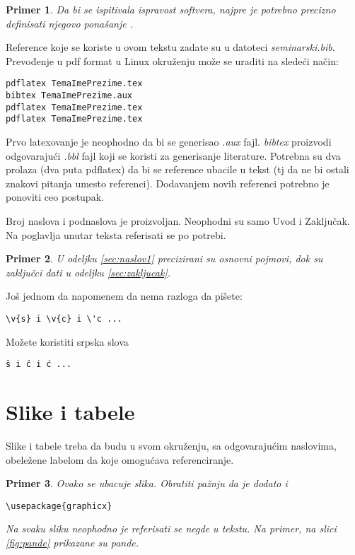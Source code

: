 \documentclass[a4paper]{article}
\newtheorem{primer}{Primer}[section]
\begin{document}
\begin{primer}
 Da bi se ispitivala ispravost softvera, najpre je potrebno precizno definisati njegovo ponašanje \cite{laski2009software}. 
\end{primer}

Reference koje se koriste u ovom tekstu zadate su u datoteci {\em seminarski.bib}. Prevođenje u pdf format u Linux okruženju može se uraditi na sledeći način:
\begin{verbatim}
pdflatex TemaImePrezime.tex 
bibtex TemaImePrezime.aux 
pdflatex TemaImePrezime.tex 
pdflatex TemaImePrezime.tex 
\end{verbatim}
Prvo latexovanje je neophodno da bi se generisao {\em .aux} fajl. {\em bibtex} proizvodi odgovarajući {\em .bbl} fajl koji se koristi za generisanje literature. 
Potrebna su dva prolaza (dva puta pdflatex) da bi se reference ubacile u tekst (tj da ne bi ostali znakovi pitanja umesto referenci). Dodavanjem novih referenci potrebno je ponoviti ceo postupak.  











Broj naslova i podnaslova je proizvoljan. Neophodni su samo Uvod i Zaključak. Na poglavlja unutar teksta referisati se po potrebi. 
\begin{primer}
U odeljku \ref{sec:naslov1} precizirani su osnovni pojmovi, dok su zaključci dati u odeljku \ref{sec:zakljucak}.
\end{primer}

Još jednom da napomenem da nema razloga da pišete:
\begin{verbatim}
\v{s} i \v{c} i \'c ...
\end{verbatim}
Možete koristiti srpska slova
\begin{verbatim}
š i č i ć ... 
\end{verbatim}



\section{Slike i tabele}
\label{slike_i_tabele}

Slike i tabele treba da budu u svom okruženju, sa odgovarajućim naslovima, obeležene labelom da koje omogućava referenciranje. 

\begin{primer} Ovako se ubacuje slika. Obratiti pažnju da je dodato i 
\begin{verbatim}
\usepackage{graphicx}
\end{verbatim}

Na svaku sliku neophodno je referisati se negde u tekstu. Na primer, na slici \ref{fig:pande} prikazane su pande. 
\end{primer}
\end{document}
